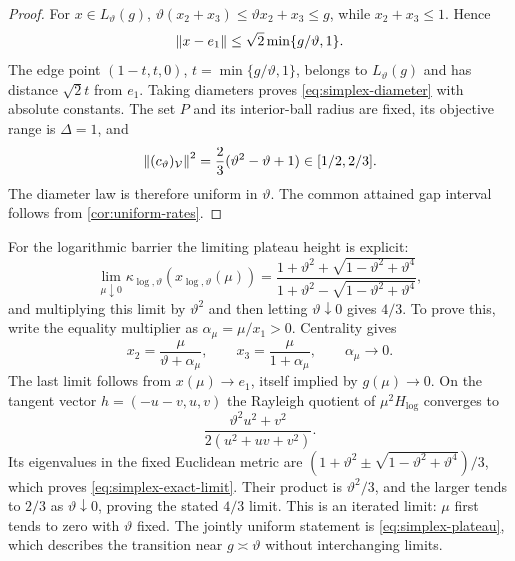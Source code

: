 \begin{proof}
For $x\in L_\vartheta(g)$,
$\vartheta(x_2+x_3)\leq\vartheta x_2+x_3\leq g$, while
$x_2+x_3\leq1$. Hence
\[
 \left\lVert x-e_1\right\rVert\leq\sqrt2\min\{g/\vartheta,1\}.
\]
The edge point
$(1-t,t,0)$, $t=\min\{g/\vartheta,1\}$, belongs to
$L_\vartheta(g)$ and has distance $\sqrt2t$ from $e_1$.
Taking diameters proves \eqref{eq:simplex-diameter} with absolute
constants. The set $P$ and its interior-ball radius are fixed, its
objective range is $\Delta=1$, and
\[
 \left\lVert (c_\vartheta)_{\mathcal V}\right\rVert^2
 =\frac23(\vartheta^2-\vartheta+1)\in[1/2,2/3].
\]
The diameter law is therefore uniform in $\vartheta$.
The common attained gap interval follows from
\cref{cor:uniform-rates}.
\end{proof}

For the logarithmic barrier the limiting plateau height is explicit:
\begin{equation}
 \lim_{\mu\downarrow0}\kappa_{\log,\vartheta}(x_{\log,\vartheta}(\mu))
 =\frac{1+\vartheta^2+\sqrt{1-\vartheta^2+\vartheta^4}}
        {1+\vartheta^2-\sqrt{1-\vartheta^2+\vartheta^4}},
 \label{eq:simplex-exact-limit}
\end{equation}
and multiplying this limit by $\vartheta^2$ and then letting
$\vartheta\downarrow0$ gives $4/3$. To prove this, write the equality
multiplier as $\alpha_\mu=\mu/x_1>0$. Centrality gives
\[
 x_2=\frac{\mu}{\vartheta+\alpha_\mu},\qquad
 x_3=\frac{\mu}{1+\alpha_\mu},\qquad
 \alpha_\mu\longrightarrow0.
\]
The last limit follows from $x(\mu)\to e_1$, itself implied by
$g(\mu)\to0$. On the tangent vector $h=(-u-v,u,v)$ the Rayleigh
quotient of $\mu^2H_{\log}$ converges to
\[
 \frac{\vartheta^2u^2+v^2}{2(u^2+uv+v^2)}.
\]
Its eigenvalues in the fixed Euclidean metric are
$(1+\vartheta^2\pm\sqrt{1-\vartheta^2+\vartheta^4})/3$,
which proves \eqref{eq:simplex-exact-limit}. Their product is
$\vartheta^2/3$, and the larger tends to $2/3$ as
$\vartheta\downarrow0$, proving the stated $4/3$ limit.
This is an iterated limit: $\mu$ first tends to zero with
$\vartheta$ fixed. The jointly uniform statement is
\eqref{eq:simplex-plateau}, which describes the transition near
$g\asymp\vartheta$ without interchanging limits.
